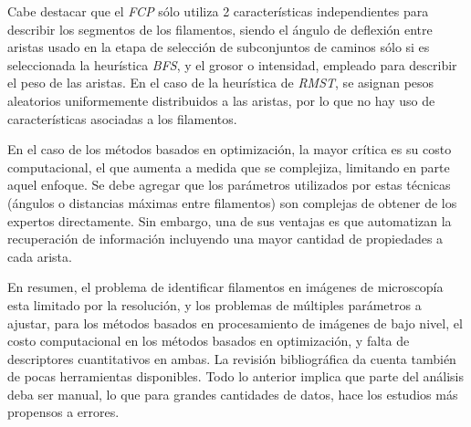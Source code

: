     

Cabe destacar que el {\it FCP} s\'olo utiliza 2 caracter\'isticas independientes para describir los segmentos de los filamentos, siendo el \'angulo de deflexi\'on entre aristas usado en la etapa de selecci\'on de subconjuntos de caminos s\'olo si es seleccionada la heur\'istica {\it BFS}, y el grosor o intensidad, empleado para describir el peso de las aristas. En el caso de la heur\'istica de {\it RMST}, se asignan pesos aleatorios uniformemente distribuidos a las aristas, por lo que no hay uso de caracter\'isticas asociadas a los filamentos.

\vspace{1cm}

En el caso de los m\'etodos basados en optimizaci\'on, la mayor cr\'itica es su costo computacional, el que aumenta a medida que se complejiza, limitando en parte aquel enfoque. Se debe agregar que los par\'ametros utilizados por estas t\'ecnicas (\'angulos o  distancias m\'aximas entre filamentos) son complejas de obtener de los expertos directamente. Sin embargo, una de sus ventajas es que automatizan la recuperaci\'on de informaci\'on incluyendo una mayor cantidad de propiedades a cada arista. 


En resumen, el problema de identificar filamentos en im\'agenes de microscop\'ia esta limitado por la resoluci\'on, y los problemas de m\'ultiples par\'ametros a ajustar, para los m\'etodos basados en procesamiento de im\'agenes de bajo nivel, el costo computacional en los m\'etodos basados en optimizaci\'on, y falta de descriptores cuantitativos en ambas. La revisi\'on bibliogr\'afica da cuenta tambi\'en de pocas herramientas disponibles. Todo lo anterior implica que parte del an\'alisis deba ser manual, lo que para grandes cantidades de datos, hace los estudios m\'as propensos a errores. 


